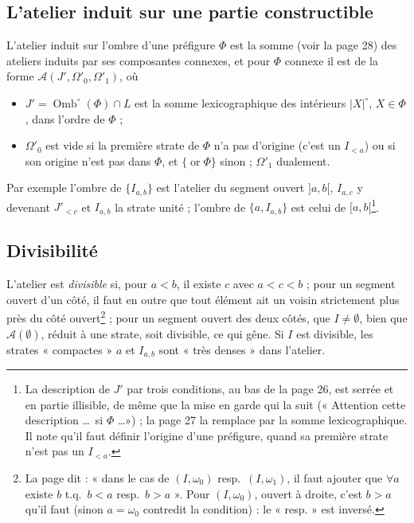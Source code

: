 \documentclass[11pt,a4paper]{article}
\begin{document}
\subsection*{L'atelier induit sur une partie constructible}

L'atelier induit sur l'ombre d'une préfigure $\Phi$ est la somme (voir la page
28) des ateliers induits par ses composantes connexes, et pour $\Phi$ connexe il
est de la forme $\mathcal{A}(J', \Omega'_{0}, \Omega'_{1})$, où
\begin{itemize}
\item $J' = \operatorname{Omb}^{\circ}(\Phi) \cap L$ est la somme lexicographique
des intérieurs $|X|^{\circ}$, $X \in \Phi$, dans l'ordre de $\Phi$ ;
\item $\Omega'_{0}$ est vide si la première strate de $\Phi$ n'a pas d'origine
(c'est un $I_{<a}$) ou si son origine n'est pas dans $\Phi$, et
$\{\operatorname{or}\Phi\}$ sinon ; $\Omega'_{1}$ dualement.
\end{itemize}
Par exemple l'ombre de $\{I_{a,b}\}$ est l'atelier du segment ouvert $]a,b[$,
$I_{a,c}$ y devenant $J'_{<c}$ et $I_{a,b}$ la strate unité ; l'ombre de $\{a,
I_{a,b}\}$ est celui de $[a,b[$\footnote{La description de $J'$ par trois
conditions, au bas de la page 26, est serrée et en partie illisible, de même que
la mise en garde qui la suit (« Attention cette description \ldots\ si $\Phi$
\ldots ») ; la page 27 la remplace par la somme lexicographique. Il note qu'il
faut définir l'origine d'une préfigure, quand sa première strate n'est pas un
$I_{<a}$.}.

\subsection*{Divisibilité}

L'atelier est \emph{divisible} si, pour $a < b$, il existe $c$ avec $a < c < b$ ;
pour un segment ouvert d'un côté, il faut en outre que tout élément ait un
voisin strictement plus près du côté ouvert\footnote{La page dit : « dans le cas
de $(I, \omega_{0})$ resp.\ $(I, \omega_{1})$, il faut ajouter que $\forall a$
existe $b$ t.q.\ $b < a$ resp.\ $b > a$ ». Pour $(I, \omega_{0})$, ouvert à
droite, c'est $b > a$ qu'il faut (sinon $a = \omega_{0}$ contredit la
condition) : le « resp. » est inversé.} ; pour un segment ouvert des deux
côtés, que $I \neq \emptyset$, bien que $\mathcal{A}(\emptyset)$, réduit à
une strate, soit divisible, ce qui gêne. Si $I$ est divisible, les strates
« compactes » $a$ et $I_{a,b}$ sont « très denses » dans l'atelier.
\end{document}
